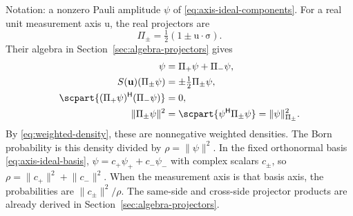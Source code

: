 \documentclass[11pt]{article}
\newcommand{\pv}[1]{{#1}}
\newcommand{\pvGreek}[1]{{#1}}
\newcommand{\vstyle}[1]{{\bm{\mathrm{#1}}}}
\newcommand{\pS}{\pv{S}}
\newcommand{\pvPi}{\pvGreek{\Pi}}
\newcommand{\pvpsi}{\pvGreek{\psi}}
\numberwithin{equation}{section}
\newcommand{\dotprod}{\cdot}
\newcommand{\bsig}{\vstyle{\sigma}}
\newcommand{\bu}{\vstyle{u}}
\begin{document}
Notation: a nonzero Pauli amplitude $\pvpsi$ of \eqref{eq:axis-ideal-components}.
For a real unit measurement axis $\bu$, the real projectors are
\begin{equation*}
 \pvPi_\pm=\tfrac12(1\pm\bu\dotprod\bsig).
\end{equation*}
Their algebra in Section~\ref{sec:algebra-projectors} gives
\begin{align*}
 \pvpsi&=\pvPi_+\pvpsi+\pvPi_-\pvpsi,\\
 \pS(\bu)(\pvPi_\pm\pvpsi)&=\pm\tfrac12\pvPi_\pm\pvpsi,\\
 \scpart{(\pvPi_+\pvpsi)^{\mathsf H}(\pvPi_-\pvpsi)}&=0,\\
 \lVert\pvPi_\pm\pvpsi\rVert^2
 &=\scpart{\pvpsi^{\mathsf H}\pvPi_\pm\pvpsi}=\lVert\pvpsi\rVert_{\pvPi_\pm}^2.
\end{align*}
By \eqref{eq:weighted-density}, these are nonnegative weighted densities.
The Born probability is this density divided by
$\rho=\lVert\pvpsi\rVert^2$.  In the fixed orthonormal basis
\eqref{eq:axis-ideal-basis}, $\pvpsi=c_+\pvpsi_++c_-\pvpsi_-$ with
complex scalars $c_\pm$, so
$\rho=\lVert c_+\rVert^2+\lVert c_-\rVert^2$.
When the measurement axis is that basis axis, the probabilities are
$\lVert c_\pm\rVert^2/\rho$.
The same-side and cross-side projector products are already derived in
Section~\ref{sec:algebra-projectors}.
\end{document}

